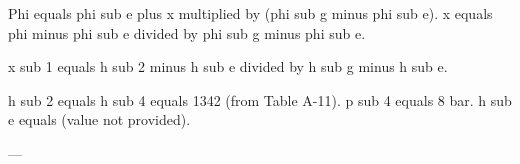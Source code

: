 Phi equals phi sub e plus x multiplied by (phi sub g minus phi sub e).  
x equals phi minus phi sub e divided by phi sub g minus phi sub e.  

x sub 1 equals h sub 2 minus h sub e divided by h sub g minus h sub e.  

h sub 2 equals h sub 4 equals 1342 (from Table A-11).  
p sub 4 equals 8 bar.  
h sub e equals (value not provided).  

---